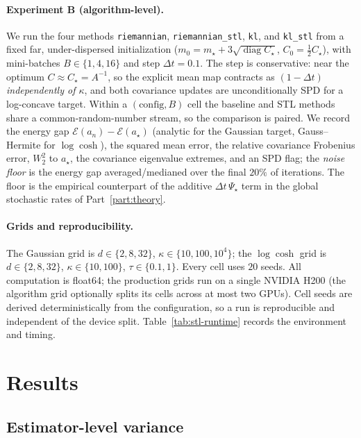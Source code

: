 \documentclass[11pt]{article}
\theoremstyle{plain}
\theoremstyle{definition}
\theoremstyle{remark}
\begin{document}
\paragraph{Experiment B (algorithm-level).}
We run the four methods \texttt{riemannian}, \texttt{riemannian\_stl},
\texttt{kl}, and \texttt{kl\_stl}
from a fixed far, under-dispersed initialization
($m_0=m_\star+3\sqrt{\operatorname{diag}C_\star}$, $C_0=\tfrac12 C_\star$), with
mini-batches $B\in\{1,4,16\}$ and step $\Delta t=0.1$. The step is conservative:
near the optimum $C\approx C_\star=A^{-1}$, so the explicit mean map contracts as
$(1-\Delta t)$ \emph{independently of $\kappa$}, and both covariance updates are
unconditionally SPD for a log-concave target. Within a $(\text{config},B)$ cell
the baseline and STL methods share a common-random-number stream, so the
comparison is paired. We record the energy gap
$\mathcal{E}(a_n)-\mathcal{E}(a_\star)$ (analytic for the Gaussian target,
Gauss--Hermite for $\log\cosh$), the squared mean error, the relative covariance
Frobenius error, $W_2^2$ to $a_\star$, the covariance eigenvalue extremes, and an
SPD flag; the \emph{noise floor} is the energy gap averaged/medianed over the
final $20\%$ of iterations. The floor is the empirical counterpart of the additive
$\Delta t\,\Psi_\star$ term in the global stochastic rates of
Part~\ref{part:theory}.

\paragraph{Grids and reproducibility.}
The Gaussian grid is $d\in\{2,8,32\}$, $\kappa\in\{10,100,10^4\}$; the $\log\cosh$
grid is $d\in\{2,8,32\}$, $\kappa\in\{10,100\}$, $\tau\in\{0.1,1\}$. Every cell
uses $20$ seeds. All computation is float64; the production grids run on a single
NVIDIA H200 (the algorithm grid optionally splits its cells across at most two
GPUs). Cell seeds are derived deterministically from the configuration, so a run
is reproducible and independent of the device split. Table~\ref{tab:stl-runtime}
records the environment and timing.

\section{Results}
\label{sec:results}

\subsection{Estimator-level variance}
\end{document}
